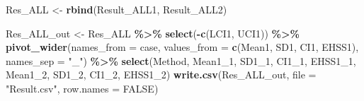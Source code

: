 \documentclass[
]{article}
\newenvironment{Shaded}{\begin{snugshade}}{\end{snugshade}}
\newcommand{\AttributeTok}[1]{\textcolor[rgb]{0.13,0.29,0.53}{#1}}
\newcommand{\ConstantTok}[1]{\textcolor[rgb]{0.56,0.35,0.01}{#1}}
\newcommand{\FunctionTok}[1]{\textcolor[rgb]{0.13,0.29,0.53}{\textbf{#1}}}
\newcommand{\NormalTok}[1]{#1}
\newcommand{\OtherTok}[1]{\textcolor[rgb]{0.56,0.35,0.01}{#1}}
\newcommand{\SpecialCharTok}[1]{\textcolor[rgb]{0.81,0.36,0.00}{\textbf{#1}}}
\newcommand{\StringTok}[1]{\textcolor[rgb]{0.31,0.60,0.02}{#1}}
\begin{document}
\begin{Shaded}
\begin{Highlighting}[]
\NormalTok{Res\_ALL }\OtherTok{\textless{}{-}} \FunctionTok{rbind}\NormalTok{(Result\_ALL1, Result\_ALL2)}

\NormalTok{Res\_ALL\_out }\OtherTok{\textless{}{-}}\NormalTok{ Res\_ALL }\SpecialCharTok{\%\textgreater{}\%}
  \FunctionTok{select}\NormalTok{(}\SpecialCharTok{{-}}\FunctionTok{c}\NormalTok{(LCI1, UCI1)) }\SpecialCharTok{\%\textgreater{}\%} 
  \FunctionTok{pivot\_wider}\NormalTok{(}\AttributeTok{names\_from =}\NormalTok{ case, }\AttributeTok{values\_from =} \FunctionTok{c}\NormalTok{(Mean1, SD1, CI1, EHSS1), }
              \AttributeTok{names\_sep =} \StringTok{"\_"}\NormalTok{) }\SpecialCharTok{\%\textgreater{}\%}
  \FunctionTok{select}\NormalTok{(Method, Mean1\_1, SD1\_1, CI1\_1, EHSS1\_1, Mean1\_2, SD1\_2, CI1\_2, EHSS1\_2)}
\FunctionTok{write.csv}\NormalTok{(Res\_ALL\_out, }\AttributeTok{file =} \StringTok{"Result.csv"}\NormalTok{, }\AttributeTok{row.names =} \ConstantTok{FALSE}\NormalTok{)}


\end{Highlighting}
\end{Shaded}
\end{document}
